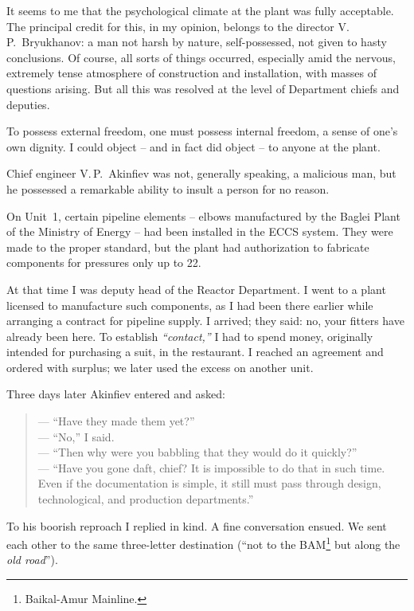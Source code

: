 \documentclass[openright]{bookest}
\begin{document}
It seems to me that the psychological climate at the plant was fully acceptable. The principal credit for this, in my opinion, belongs to the director V.\,P.~Bryukhanov: a man not harsh by nature, self-possessed, not given to hasty conclusions. Of course, all sorts of things occurred, especially amid the nervous, extremely tense atmosphere of construction and installation, with masses of questions arising. But all this was resolved at the level of Department chiefs and deputies.

To possess external freedom, one must possess internal freedom, a sense of one's own dignity. I could object -- and in fact did object -- to anyone at the plant.

Chief engineer V.\,P.~Akinfiev was not, generally speaking, a malicious man, but he possessed a remarkable ability to insult a person for no reason.

On Unit~1, certain pipeline elements -- elbows manufactured by the Baglei Plant of the Ministry of Energy -- had been installed in the ECCS system. They were made to the proper standard, but the plant had authorization to fabricate components for pressures only up to \qty{22}{\atmosphere}.

At that time I was deputy head of the Reactor Department. I went to a plant licensed to manufacture such components, as I had been there earlier while arranging a contract for pipeline supply. I arrived; they said: no, your fitters have already been here. To establish \textit{``contact,''} I had to spend money, originally intended for purchasing a suit, in the restaurant. I reached an agreement and ordered with surplus; we later used the excess on another unit.

Three days later Akinfiev entered and asked:

\begin{quote}
--- ``Have they made them yet?''\\
--- ``No,'' I said.\\
--- ``Then why were you babbling that they would do it quickly?''\\
--- ``Have you gone daft, chief? It is impossible to do that in such time. Even if the documentation is simple, it still must pass through design, technological, and production departments.''
\end{quote}

To his boorish reproach I replied in kind. A fine conversation ensued. We sent each other to the same three-letter destination (``not to the BAM\footnote{Baikal-Amur Mainline.} but along the \textit{old road}'').
\end{document}
